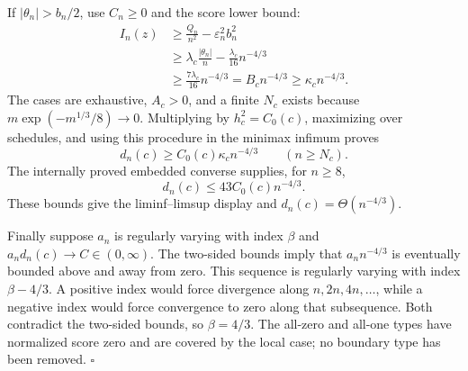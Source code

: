 If \(|\theta_n|>b_n/2\), use \(C_n\geq0\) and the score lower bound:
\[
 \begin{aligned}
 I_n(z)&\geq\frac{Q_n}{n^2}-\varepsilon_n^2b_n^2\\
 &\geq\lambda_c\frac{|\theta_n|}{n}-\frac{\lambda_c}{16}n^{-4/3}\\
 &\geq\frac{7\lambda_c}{16}n^{-4/3}
 =B_cn^{-4/3}\geq\kappa_cn^{-4/3}.
 \end{aligned}
\]
The cases are exhaustive, \(A_c>0\), and a finite \(N_c\) exists because \(m\exp(-m^{1/3}/8)\to0\). Multiplying by \(h_c^2=C_0(c)\), maximizing over schedules, and using this procedure in the minimax infimum proves
\[
 d_n(c)\geq C_0(c)\kappa_cn^{-4/3}
 \qquad(n\geq N_c).
\]
The internally proved embedded converse supplies, for \(n\geq8\),
\[
 d_n(c)\leq43C_0(c)n^{-4/3}.
\]
These bounds give the liminf--limsup display and \(d_n(c)=\Theta(n^{-4/3})\).

Finally suppose \(a_n\) is regularly varying with index \(\beta\) and \(a_nd_n(c)\to C\in(0,\infty)\). The two-sided bounds imply that \(a_nn^{-4/3}\) is eventually bounded above and away from zero. This sequence is regularly varying with index \(\beta-4/3\). A positive index would force divergence along \(n,2n,4n,\ldots\), while a negative index would force convergence to zero along that subsequence. Both contradict the two-sided bounds, so \(\beta=4/3\). The all-zero and all-one types have normalized score zero and are covered by the local case; no boundary type has been removed. \(\square\)